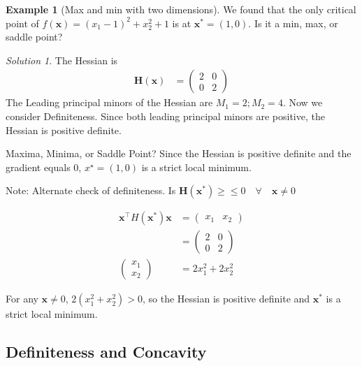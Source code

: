 \documentclass[
]{book}
\theoremstyle{definition}
\theoremstyle{definition}
\newtheorem{example}{Example}[chapter]
\theoremstyle{definition}
\theoremstyle{definition}
\theoremstyle{remark}
\newtheorem*{solution}{Solution}
\begin{document}
\begin{example}[Max and min with two dimensions]
\protect\hypertarget{exm:unnamed-chunk-244}{}{\label{exm:unnamed-chunk-244} {} }
We found that the only critical point of
\(f(\mathbf{x})=(x_1-1)^2+x_2^2+1\) is at \(\mathbf{x}^*=(1,0)\). Is it a min, max, or
saddle point?
\end{example}

\begin{solution}
{}
The Hessian is
\begin{align*}
\mathbf{H(x)} &= \begin{pmatrix} 2&0\\0&2 \end{pmatrix}
\end{align*}
The Leading principal minors of the Hessian are \(M_1=2; M_2=4\). Now we consider Definiteness. Since both leading principal minors are positive, the Hessian is positive definite.

Maxima, Minima, or Saddle Point? Since the Hessian is positive definite and the gradient equals 0, \(x^\star = (1,0)\) is a strict local minimum.

Note: Alternate check of definiteness. Is \(\mathbf{H(x^*)} \geq \leq 0 \quad \forall \quad \mathbf{x}\ne 0\)

\begin{align*}
\mathbf{x}^\top H(\mathbf{x}^*) \mathbf{x} &= \begin{pmatrix} x_1 & x_2 \end{pmatrix}\\
&= \begin{pmatrix} 2&0\\0&2 \end{pmatrix}\\
\begin{pmatrix} x_1\\x_2\end{pmatrix} &= 2x_1^2+2x_2^2
\end{align*}

For any \(\mathbf{x}\ne 0\), \(2(x_1^2+x_2^2)>0\), so the Hessian is positive definite and \(\mathbf{x}^*\) is a strict local minimum.
\end{solution}

\hypertarget{definiteness-and-concavity}{%
\subsection*{Definiteness and Concavity}\label{definiteness-and-concavity}}
\end{document}
